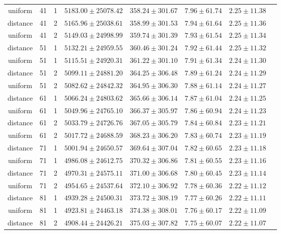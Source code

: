 \begin{tabular}{cccrrrrr}
uniform & 41 & 1 & $5183.00 \pm 25078.42$ & $358.24 \pm 301.67$ & $7.96 \pm 61.74$ & $2.25 \pm 11.38$\\
distance & 41 & 2 & $5165.96 \pm 25038.61$ & $358.99 \pm 301.53$ & $7.94 \pm 61.64$ & $2.25 \pm 11.36$\\
uniform & 41 & 2 & $5149.03 \pm 24998.99$ & $359.74 \pm 301.39$ & $7.93 \pm 61.54$ & $2.25 \pm 11.34$\\
distance & 51 & 1 & $5132.21 \pm 24959.55$ & $360.46 \pm 301.24$ & $7.92 \pm 61.44$ & $2.25 \pm 11.32$\\
uniform & 51 & 1 & $5115.51 \pm 24920.31$ & $361.22 \pm 301.10$ & $7.91 \pm 61.34$ & $2.24 \pm 11.30$\\
distance & 51 & 2 & $5099.11 \pm 24881.20$ & $364.25 \pm 306.48$ & $7.89 \pm 61.24$ & $2.24 \pm 11.29$\\
uniform & 51 & 2 & $5082.62 \pm 24842.32$ & $364.95 \pm 306.30$ & $7.88 \pm 61.14$ & $2.24 \pm 11.27$\\
distance & 61 & 1 & $5066.24 \pm 24803.62$ & $365.66 \pm 306.14$ & $7.87 \pm 61.04$ & $2.24 \pm 11.25$\\
uniform & 61 & 1 & $5049.96 \pm 24765.10$ & $366.37 \pm 305.97$ & $7.86 \pm 60.94$ & $2.24 \pm 11.23$\\
distance & 61 & 2 & $5033.79 \pm 24726.76$ & $367.05 \pm 305.79$ & $7.84 \pm 60.84$ & $2.23 \pm 11.21$\\
uniform & 61 & 2 & $5017.72 \pm 24688.59$ & $368.23 \pm 306.20$ & $7.83 \pm 60.74$ & $2.23 \pm 11.19$\\
distance & 71 & 1 & $5001.94 \pm 24650.57$ & $369.64 \pm 307.04$ & $7.82 \pm 60.65$ & $2.23 \pm 11.18$\\
uniform & 71 & 1 & $4986.08 \pm 24612.75$ & $370.32 \pm 306.86$ & $7.81 \pm 60.55$ & $2.23 \pm 11.16$\\
distance & 71 & 2 & $4970.31 \pm 24575.11$ & $371.00 \pm 306.68$ & $7.80 \pm 60.45$ & $2.23 \pm 11.14$\\
uniform & 71 & 2 & $4954.65 \pm 24537.64$ & $372.10 \pm 306.92$ & $7.78 \pm 60.36$ & $2.22 \pm 11.12$\\
distance & 81 & 1 & $4939.28 \pm 24500.31$ & $373.72 \pm 308.19$ & $7.77 \pm 60.26$ & $2.22 \pm 11.11$\\
uniform & 81 & 1 & $4923.81 \pm 24463.18$ & $374.38 \pm 308.01$ & $7.76 \pm 60.17$ & $2.22 \pm 11.09$\\
distance & 81 & 2 & $4908.44 \pm 24426.21$ & $375.03 \pm 307.82$ & $7.75 \pm 60.07$ & $2.22 \pm 11.07$\\

\end{tabular}
